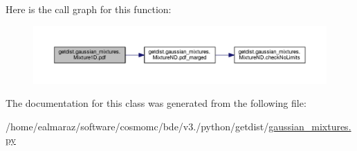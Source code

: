 Here is the call graph for this function\+:
\nopagebreak
\begin{figure}[H]
\begin{center}
\leavevmode
\includegraphics[width=350pt]{classgetdist_1_1gaussian__mixtures_1_1Mixture1D_a23be258f48e4829421085cccbf568478_cgraph}
\end{center}
\end{figure}


The documentation for this class was generated from the following file\+:\begin{DoxyCompactItemize}
\item 
/home/ealmaraz/software/cosmomc/bde/v3./python/getdist/\mbox{\hyperlink{gaussian__mixtures_8py}{gaussian\+\_\+mixtures.\+py}}\end{DoxyCompactItemize}
